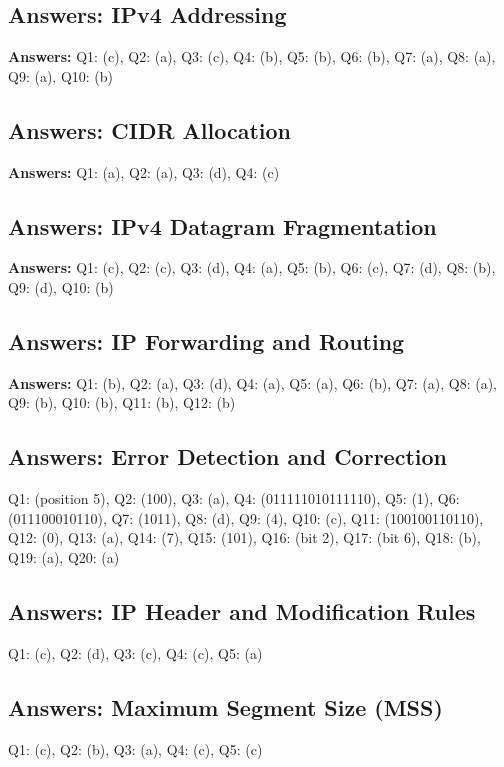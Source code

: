 \subsection*{Answers: IPv4 Addressing}
\noindent\textbf{Answers:} Q1: (c), Q2: (a), Q3: (c), Q4: (b), Q5: (b), Q6: (b), Q7: (a), Q8: (a), Q9: (a), Q10: (b)

\subsection*{Answers: CIDR Allocation}
\noindent\textbf{Answers:} Q1: (a), Q2: (a), Q3: (d), Q4: (c)

\subsection*{Answers: IPv4 Datagram Fragmentation}
\noindent\textbf{Answers:} Q1: (c), Q2: (c), Q3: (d), Q4: (a), Q5: (b), Q6: (c), Q7: (d), Q8: (b), Q9: (d), Q10: (b)

\subsection*{Answers: IP Forwarding and Routing}
\noindent\textbf{Answers:} Q1: (b), Q2: (a), Q3: (d), Q4: (a), Q5: (a), Q6: (b), Q7: (a), Q8: (a), Q9: (b), Q10: (b), Q11: (b), Q12: (b)

\subsection*{Answers: Error Detection and Correction}
\noindent Q1: (position 5), Q2: (100), Q3: (a), Q4: (011111010111110), Q5: (1), Q6: (011100010110), Q7: (1011), Q8: (d), Q9: (4), Q10: (c), Q11: (100100110110), Q12: (0), Q13: (a), Q14: (7), Q15: (101), Q16: (bit 2), Q17: (bit 6), Q18: (b), Q19: (a), Q20: (a)

\subsection*{Answers: IP Header and Modification Rules}
Q1: (c), Q2: (d), Q3: (c), Q4: (c), Q5: (a)

\subsection*{Answers: Maximum Segment Size (MSS)}
Q1: (c), Q2: (b), Q3: (a), Q4: (c), Q5: (c)